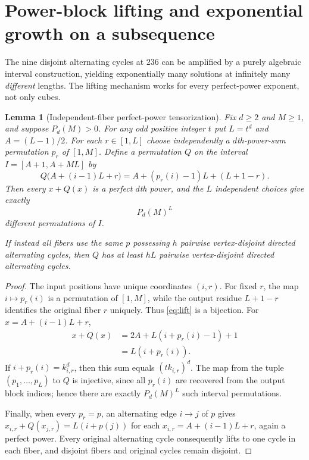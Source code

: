 \documentclass[10pt]{article}
\newtheorem{lemma}{Lemma}
\begin{document}
\section{Power-block lifting and exponential growth on a subsequence}
\label{sec:lifting}

The nine disjoint alternating cycles at $236$
can be amplified by a purely algebraic interval
construction, yielding exponentially many solutions
at infinitely many \emph{different} lengths.
The lifting mechanism works for every perfect-power
exponent, not only cubes.

\begin{lemma}[Independent-fiber perfect-power tensorization]
\label{lem:block}
Fix $d\ge2$ and $M\ge1$, and suppose $P_d(M)>0$.
For any odd positive integer $t$ put
$L=t^d$ and $A=(L-1)/2$.
For each $r\in[1,L]$ choose independently a
$d$th-power-sum permutation $p_r$ of $[1,M]$.
Define a permutation $Q$ on the interval
$I=[A+1,A+ML]$ by
\begin{equation}\label{eq:lift}
Q\bigl(A+(i-1)L+r\bigr)
=A+(p_r(i)-1)L+(L+1-r).
\end{equation}
Then every $x+Q(x)$ is a perfect $d$th power,
and the $L$ independent choices give exactly
\[
\boxed{P_d(M)^L}
\]
different permutations of $I$.

If instead all fibers use the same $p$ possessing
$h$ pairwise vertex-disjoint directed alternating
cycles, then $Q$ has at least $hL$ pairwise
vertex-disjoint directed alternating cycles.
\end{lemma}
\begin{proof}
The input positions have unique coordinates $(i,r)$.
For fixed $r$, the map $i\mapsto p_r(i)$ is a
permutation of $[1,M]$, while the output
residue $L+1-r$ identifies the original fiber
$r$ uniquely. Thus \eqref{eq:lift} is a bijection.
For $x=A+(i-1)L+r$,
\[
\begin{aligned}
x+Q(x)
 &=2A+L(i+p_r(i)-1)+1\\
 &=L(i+p_r(i)).
\end{aligned}
\]
If $i+p_r(i)=k_{i,r}^d$, then this sum equals
$(t k_{i,r})^d$.
The map from the tuple $(p_1,\ldots,p_L)$ to $Q$
is injective, since all $p_r(i)$ are recovered
from the output block indices; hence there are
exactly $P_d(M)^L$ such interval permutations.

Finally, when every $p_r=p$, an alternating
edge $i\to j$ of $p$ gives
$x_{i,r}+Q(x_{j,r})=L(i+p(j))$ for each
$x_{i,r}=A+(i-1)L+r$, again a perfect power.
Every original alternating cycle consequently
lifts to one cycle in each fiber, and disjoint
fibers and original cycles remain disjoint.
\end{proof}
\end{document}

